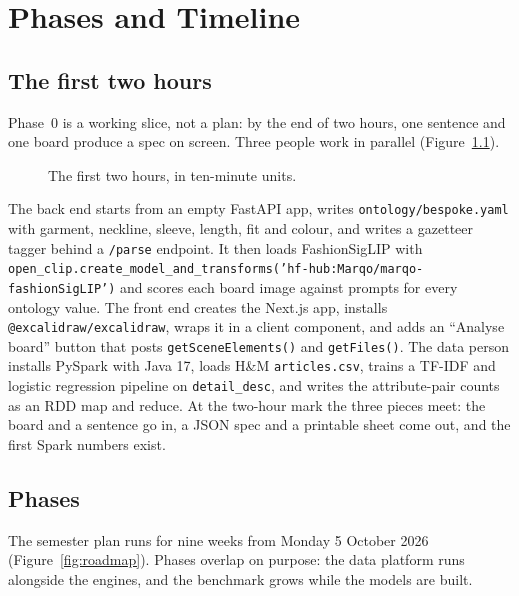 \chapter{Phases and Timeline}\label{ch:phases}

\section{The first two hours}

Phase~0 is a working slice, not a plan: by the end of two hours, one sentence and one board produce a spec on screen. Three people work in parallel (Figure~\ref{fig:2h}).

\begin{figure}[h]
\centering
\caption{The first two hours, in ten-minute units.}\label{fig:2h}
\end{figure}

The back end starts from an empty FastAPI app, writes \texttt{ontology/bespoke.yaml} with garment, neckline, sleeve, length, fit and colour, and writes a gazetteer tagger behind a \texttt{/parse} endpoint. It then loads FashionSigLIP with \texttt{open\_clip.create\_model\_and\_transforms('hf-hub:Marqo/marqo-fashionSigLIP')} and scores each board image against prompts for every ontology value. The front end creates the Next.js app, installs \texttt{@excalidraw/excalidraw}, wraps it in a client component, and adds an ``Analyse board'' button that posts \texttt{getSceneElements()} and \texttt{getFiles()}. The data person installs PySpark with Java 17, loads H\&M \texttt{articles.csv}, trains a TF-IDF and logistic regression pipeline on \texttt{detail\_desc}, and writes the attribute-pair counts as an RDD map and reduce. At the two-hour mark the three pieces meet: the board and a sentence go in, a JSON spec and a printable sheet come out, and the first Spark numbers exist.

\section{Phases}

The semester plan runs for nine weeks from Monday 5 October 2026 (Figure~\ref{fig:roadmap}). Phases overlap on purpose: the data platform runs alongside the engines, and the benchmark grows while the models are built.

